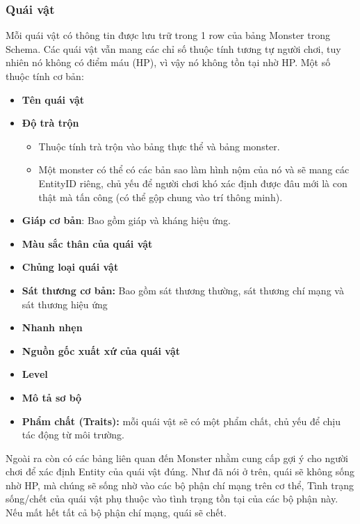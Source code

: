 \subsubsection{Quái vật}
\hspace*{1cm} Mỗi quái vật có thông tin được lưu trữ trong 1 row của bảng Monster trong Schema. Các quái vật vẫn mang các chỉ số thuộc tính tương tự người chơi, tuy nhiên nó không có điểm máu (HP), vì vậy nó không tồn tại nhờ HP. Một số thuộc tính cơ bản:\\
\begin{itemize}
	\item \textbf{Tên quái vật}
	\item \textbf{Độ trà trộn}
	\begin{itemize}
		\item Thuộc tính trà trộn vào bảng thực thể và bảng monster.
		\item Một monster có thể có các bản sao làm hình nộm của nó và sẽ mang các EntityID riêng, chủ yếu để người chơi khó xác định được đâu mới là con thật mà tấn công (có thể gộp chung vào trí thông minh).
	\end{itemize}
	\item \textbf{Giáp cơ bản}: Bao gồm giáp và kháng hiệu ứng.
	\item \textbf{Màu sắc thân của quái vật}
	\item \textbf{Chủng loại quái vật}
	\item \textbf{Sát thương cơ bản: } Bao gồm sát thương thường, sát thương chí mạng và sát thương hiệu ứng
	\item \textbf{Nhanh nhẹn}
	\item \textbf{Nguồn gốc xuất xứ của quái vật}
	\item \textbf{Level}
	\item \textbf{Mô tả sơ bộ}
	\item \textbf{Phẩm chất (Traits):} mỗi quái vật sẽ có một phẩm chất, chủ yếu để chịu tác động từ môi trường.
\end{itemize}
\hspace*{1cm} Ngoài ra còn có các bảng liên quan đến Monster nhằm cung cấp gợi ý cho người chơi để xác định Entity của quái vật đúng.
\hspace*{1cm} Như đã nói ở trên, quái sẽ không sống nhờ HP, mà chúng sẽ sống nhờ vào các bộ phận chí mạng trên cơ thể, Tình trạng sống/chết của quái vật phụ thuộc vào tình trạng tồn tại của các bộ phận này. Nếu mất hết tất cả bộ phận chí mạng, quái sẽ chết.\\
